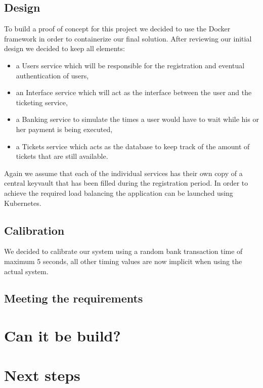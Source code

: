 \documentclass[10pt,a4paper,twocolumn]{article}
\begin{document}
\subsection{Design}
To build a proof of concept for this project we decided to use the Docker framework in order to containerize our final solution. After reviewing our initial design we decided to keep all elements:
\begin{itemize}
	\item a Users service which will be responsible for the registration and eventual authentication of users,
	\item an Interface service which will act as the interface between the user and the ticketing service,
	\item a Banking service to simulate the times a user would have to wait while his or her payment is being executed,
	\item a Tickets service which acts as the database to keep track of the amount of tickets that are still available.
\end{itemize}
Again we assume that each of the individual services has their own copy of a central keyvault that has been filled during the registration period. In order to achieve the required load balancing the application can be launched using Kubernetes.\\

\subsection{Calibration}
We decided to calibrate our system using a random bank transaction time of maximum 5 seconds, all other timing values are now implicit when using the actual system.

\subsection{Meeting the requirements}

\section{Can it be build?}

\section{Next steps}
\end{document}
